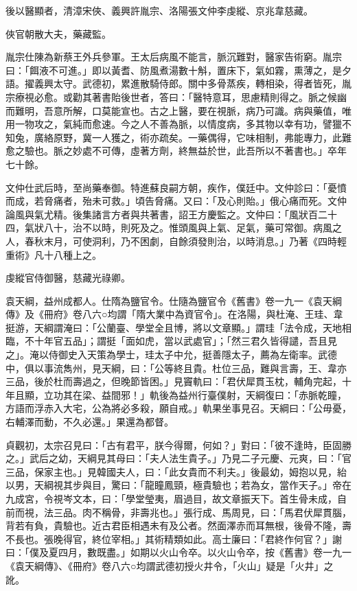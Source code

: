 \begin{pinyinscope}
 後以醫顯者，清漳宋俠、義興許胤宗、洛陽張文仲李虔縱、京兆韋慈藏。



 俠官朝散大夫，藥藏監。



 胤宗仕陳為新蔡王外兵參軍。王太后病風不能言，脈沉難對，醫家告術窮。胤宗曰：「餌液不可進。」即以黃耆、防風煮湯數十斛，置床下，氣如霧，熏薄之，是夕語。擢義興太守。武德初，累進散騎侍郎。關中多骨蒸疾，轉相染，得者皆死，胤宗療視必愈。或勸其著書貽後世者，答曰：「醫特意耳，思慮精則得之。脈之候幽而難明，吾意所解，口莫能宣也。古之上醫，要在視脈，病乃可識。病與藥值，唯用一物攻之，氣純而愈速。今之人不善為脈，以情度病，多其物以幸有功，譬獵不知兔，廣絡原野，冀一人獲之，術亦疏矣。一藥偶得，它味相制，弗能專力，此難愈之驗也。脈之妙處不可傳，虛著方劑，終無益於世，此吾所以不著書也。」卒年七十餘。



 文仲仕武后時，至尚藥奉御。特進蘇良嗣方朝，疾作，僕廷中。文仲診曰：「憂憤而成，若脅痛者，殆未可救。」頃告脅痛。又曰：「及心則貽。」俄心痛而死。文仲論風與氣尤精。後集諸言方者與共著書，詔王方慶監之。文仲曰：「風狀百二十四，氣狀八十，治不以時，則死及之。惟頭風與上氣、足氣，藥可常御。病風之人，春秋末月，可使洞利，乃不困劇，自餘須發則治，以時消息。」乃著《四時輕重術》凡十八種上之。



 虔縱官侍御醫，慈藏光祿卿。



 袁天綱，益州成都人。仕隋為鹽官令。仕隨為鹽官令《舊書》卷一九一《袁天綱傳》及《冊府》卷八六○均謂「隋大業中為資官令」。在洛陽，與杜淹、王珪、韋挺游，天綱謂淹曰：「公蘭臺、學堂全且博，將以文章顯。」謂珪「法令成，天地相臨，不十年官五品」；謂挺「面如虎，當以武處官」；「然三君久皆得譴，吾且見之」。淹以侍御史入天策為學士，珪太子中允，挺善隱太子，薦為左衛率。武德中，俱以事流雋州，見天綱，曰：「公等終且貴。杜位三品，難與言壽，王、韋亦三品，後於杜而壽過之，但晚節皆困。」見竇軌曰：「君伏犀貫玉枕，輔角完起，十年且顯，立功其在梁、益間邪！」軌後為益州行臺僕射，天綱復曰：「赤脈乾瞳，方語而浮赤入大宅，公為將必多殺，願自戒。」軌果坐事見召。天綱曰：「公毋憂，右輔澤而動，不久必還。」果還為都督。



 貞觀初，太宗召見曰：「古有君平，朕今得爾，何如？」對曰：「彼不逢時，臣固勝之。」武后之幼，天綱見其母曰：「夫人法生貴子。」乃見二子元慶、元爽，曰：「官三品，保家主也。」見韓國夫人，曰：「此女貴而不利夫。」後最幼，姆抱以見，紿以男，天綱視其步與目，驚曰：「龍瞳鳳頸，極貴驗也；若為女，當作天子。」帝在九成宮，令視岑文本，曰：「學堂瑩夷，眉過目，故文章振天下。首生骨未成，自前而視，法三品。肉不稱骨，非壽兆也。」張行成、馬周見，曰：「馬君伏犀貫腦，背若有負，貴驗也。近古君臣相遇未有及公者。然面澤赤而耳無根，後骨不隆，壽不長也。張晚得官，終位宰相。」其術精類如此。高士廉曰：「君終作何官？」謝曰：「僕及夏四月，數既盡。」如期以火山令卒。以火山令卒，按《舊書》卷一九一《袁天綱傳》、《冊府》卷八六○均謂武德初授火井令，「火山」疑是「火井」之訛。




\end{pinyinscope}
